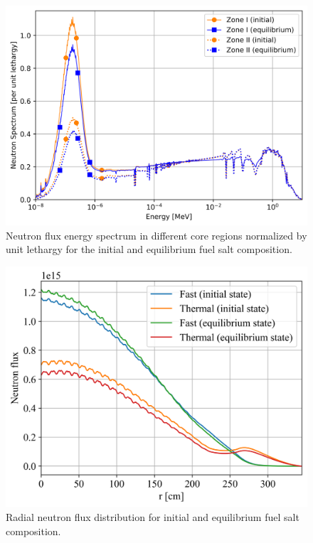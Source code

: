 \documentclass[review]{elsarticle}
\begin{document}
\begin{figure}[htbp!]
    \begin{center}
		\includegraphics[width=\textwidth]{spectrum_zones.png} 
    \end{center}
	\caption{Neutron flux energy spectrum in different core regions normalized by unit lethargy for the initial and equilibrium fuel salt composition.}
	\label{fig:spectrum_zones}
\end{figure}
\begin{figure}[htbp!]
    \begin{center}
		\includegraphics[width=\textwidth]{radial_flux.png} 
    \end{center}
	\caption{Radial neutron flux distribution for initial and equilibrium fuel salt composition.}
	\label{fig:radial_flux}
\end{figure}
\end{document}

